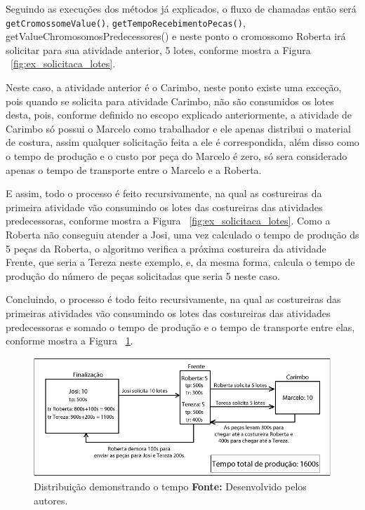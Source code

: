 \par Seguindo as execuções dos métodos já explicados, o fluxo de chamadas então será \texttt{getCromossomeValue()}, \texttt{getTempoRecebimentoPecas()}, getValueChromosomosPredecessores() e neste ponto o cromossomo Roberta irá solicitar 
para sua atividade anterior, 5 lotes, conforme mostra a Figura ~\ref{fig:ex_solicitaca_lotes}.

\par Neste caso, a atividade anterior é o Carimbo, neste ponto existe uma exceção, pois quando 
se solicita para atividade Carimbo, não são consumidos os lotes desta, pois, conforme definido 
no escopo explicado anteriormente, a atividade de Carimbo só possui o Marcelo como trabalhador e ele
apenas distribui o material de costura, assim qualquer solicitação feita a ele é correspondida, além 
disso como o tempo de produção e o custo por peça do Marcelo é zero, só sera considerado apenas
o tempo de transporte entre o Marcelo e a Roberta.

\par E assim, todo  o processo é feito recursivamente, na qual as costureiras
da primeira atividade vão consumindo os lotes das costureiras das atividades
predecessoras, conforme mostra a Figura ~\ref{fig:ex_solicitaca_lotes}.
Como a Roberta não conseguiu atender a Josi, uma vez calculado o tempo de produção ds 5 peças da Roberta, 
o algoritmo verifica a próxima costureira da atividade Frente, que seria a Tereza neste exemplo, e, da mesma forma, calcula
o tempo de produção do número de peças solicitadas que seria 5 neste caso.

\par Concluindo, o processo é todo feito recursivamente, na qual as costureiras das primeiras atividades vão consumindo
os lotes das costureiras das atividades predecessoras e somado o tempo de produção e o tempo de transporte entre elas, 
conforme mostra a Figura ~\ref{fig:ex_tempo_producao}. 


\begin{figure}[h!]
	\centerline{\includegraphics[scale=1.2]{./imagens/distribuicao_tempo.png}}
	\caption[Distribuição demonstrando o tempo]
	{Distribuição demonstrando o tempo
		\textbf{Fonte:} Desenvolvido pelos autores.}
	\label{fig:ex_tempo_producao}
\end{figure}

